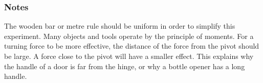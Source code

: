 \subsubsection*{Notes}
The wooden bar or metre rule should be uniform in order to simplify this experiment.
Many objects and tools operate by the principle of moments.  For a turning force to be more effective, the distance of the force from the pivot should be large.  A force close to the pivot will have a smaller effect.  This explains why the handle of a door is far from the hinge, or why a bottle opener has a long handle.
